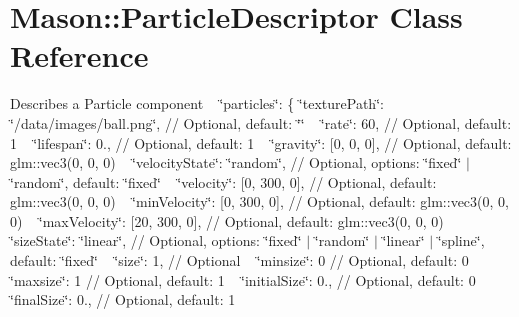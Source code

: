 \hypertarget{class_mason_1_1_particle_descriptor}{}\section{Mason\+:\+:Particle\+Descriptor Class Reference}
\label{class_mason_1_1_particle_descriptor}


Describes a Particle component ~\newline
 \char`\"{}particles\char`\"{}\+: \{ \char`\"{}texture\+Path\char`\"{}\+: \char`\"{}/data/images/ball.\+png\char`\"{}, // Optional, default\+: \char`\"{}\char`\"{} ~\newline
 \char`\"{}rate\char`\"{}\+: 60, // Optional, default\+: 1 ~\newline
 \char`\"{}lifespan\char`\"{}\+: 0., // Optional, default\+: 1 ~\newline
 \char`\"{}gravity\char`\"{}\+: \mbox{[}0, 0, 0\mbox{]}, // Optional, default\+: glm\+::vec3(0, 0, 0) ~\newline
 \char`\"{}velocity\+State\char`\"{}\+: \char`\"{}random\char`\"{}, // Optional, options\+: \char`\"{}fixed\char`\"{} $\vert$ \char`\"{}random\char`\"{}, default\+: \char`\"{}fixed\char`\"{} ~\newline
 \char`\"{}velocity\char`\"{}\+: \mbox{[}0, 300, 0\mbox{]}, // Optional, default\+: glm\+::vec3(0, 0, 0) ~\newline
 \char`\"{}min\+Velocity\char`\"{}\+: \mbox{[}0, 300, 0\mbox{]}, // Optional, default\+: glm\+::vec3(0, 0, 0) ~\newline
 \char`\"{}max\+Velocity\char`\"{}\+: \mbox{[}20, 300, 0\mbox{]}, // Optional, default\+: glm\+::vec3(0, 0, 0) ~\newline
 \char`\"{}size\+State\char`\"{}\+: \char`\"{}linear\char`\"{}, // Optional, options\+: \char`\"{}fixed\char`\"{} $\vert$ \char`\"{}random\char`\"{} $\vert$ \char`\"{}linear\char`\"{} $\vert$ \char`\"{}spline\char`\"{}, default\+: \char`\"{}fixed\char`\"{} ~\newline
 \char`\"{}size\char`\"{}\+: 1, // Optional ~\newline
 \char`\"{}minsize\char`\"{}\+: 0 // Optional, default\+: 0 ~\newline
 \char`\"{}maxsize\char`\"{}\+: 1 // Optional, default\+: 1 ~\newline
 \char`\"{}initial\+Size\char`\"{}\+: 0., // Optional, default\+: 0 ~\newline
 \char`\"{}final\+Size\char`\"{}\+: 0., // Optional, default\+: 1 ~\newline
